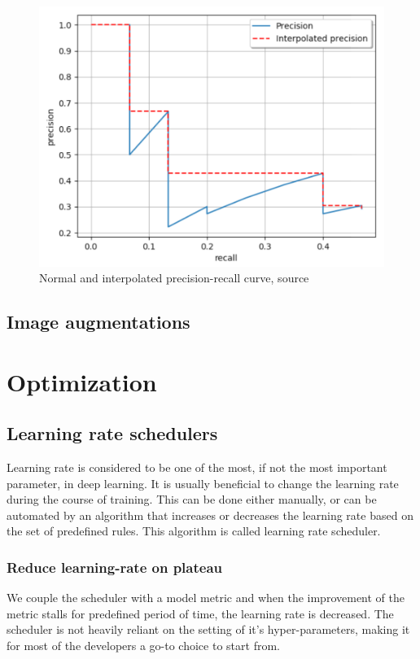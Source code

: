 \begin{figure}
    \includegraphics[width = \linewidth]{images/PR-curve.png}
    \caption{Normal and interpolated precision-recall curve, source \cite{Padilla2020}}
    \label{fig:pr_curve}
\end{figure}


\subsection{Image augmentations}


\section{Optimization}
\subsection{Learning rate schedulers}
Learning rate is considered to be one of the most, if not the most important parameter, in deep learning. It is usually beneficial to change the learning rate during the course of training. This can be done either manually, or can be automated by an algorithm that increases or decreases the learning rate based on the set of predefined rules. This algorithm is called learning rate scheduler.

\subsubsection{Reduce learning-rate on plateau}
We couple the scheduler with a model metric and when the improvement of the metric stalls for predefined period of time, the learning rate is decreased.
The scheduler is not heavily reliant on the setting of it's hyper-parameters, making it for most of the developers a go-to choice to start from.



